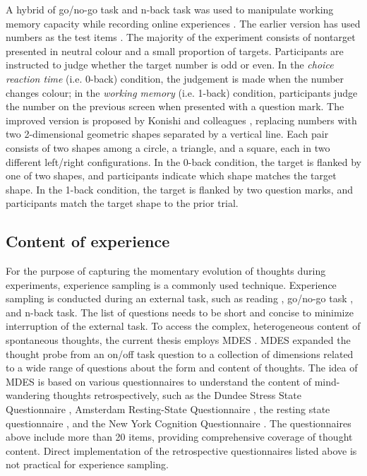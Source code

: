 A hybrid of go/no-go task and n-back task was used to manipulate working memory capacity while recording online experiences \cite{Konishi2015, Medea2016}. The earlier version has used numbers as the test items \cite{SmallwoodNI2013,SmallwoodPlos2011}. The majority of the experiment consists of nontarget presented in neutral colour and a small proportion of targets. Participants are instructed to judge whether the target number is odd or even. In the \textit{choice reaction time} (i.e. 0-back) condition, the judgement is made when the number changes colour; in the \textit{working memory} (i.e. 1-back) condition, participants judge the number on the previous screen when presented with a question mark. The improved version is proposed by Konishi and colleagues \citeyear{Konishi2015}, replacing numbers with two 2-dimensional geometric shapes separated by a vertical line. Each pair consists of two shapes among a circle, a triangle, and a square, each in two different left/right configurations. In the 0-back condition, the target is flanked by one of two shapes, and participants indicate which shape matches the target shape. In the 1-back condition, the target is flanked by two question marks, and participants match the target shape to the prior trial. 

\subsection{Content of experience}

For the purpose of capturing the momentary evolution of thoughts during experiments, experience sampling \cite{Kahneman2004} is a commonly used technique. Experience sampling is conducted during an external task, such as reading \cite{Franklin2011}, go/no-go task \cite{Christoff2009}, and n-back task\cite{Kane2007}. The list of questions needs to be short and concise to minimize interruption of the external task. To access the complex, heterogeneous content of spontaneous thoughts, the current thesis employs MDES \cite{Medea2016, RubyPlos2013, Smallwood2016}. MDES expanded the thought probe from an on/off task question to a collection of dimensions related to a wide range of questions about the form and content of thoughts. The idea of MDES is based on various questionnaires to understand the content of mind-wandering thoughts retrospectively, such as the Dundee Stress State Questionnaire \cite{Matthews1999}, Amsterdam Resting-State Questionnaire \cite{Diaz2013}, the resting state questionnaire \cite{Delamillieure2010}, and the New York Cognition Questionnaire \cite{Gorgolewski2014}. The questionnaires above include more than 20 items, providing comprehensive coverage of thought content. Direct implementation of the retrospective questionnaires listed above is not practical for experience sampling. 

